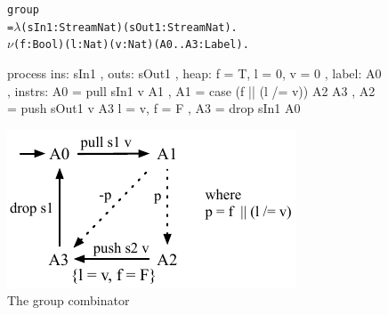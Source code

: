 \begin{figure}

\begin{center}
\begin{alltt}
           group 
             = \(\lambda\) (sIn1: Stream Nat) (sOut1: Stream Nat). 
               \(\nu\) (f: Bool) (l: Nat) (v: Nat) (A0..A3: Label).
\end{alltt}
\begin{code}
               process
               { ins:    { sIn1  }
               , outs:   { sOut1 }
               , heap:   { f = T, l = 0, v = 0 }
               , label:  A0
               , instrs: { A0 = pull sIn1 v          A1 {}
                         , A1 = case (f || (l /= v)) A2 {}  A3 {}
                         , A2 = push sOut1 v         A3 { l = v, f = F }
                         , A3 = drop sIn1            A0 {} } }
\end{code}
\end{center}
\vspace{1em}
\includegraphics[scale=1.1]{figures/state-group.pdf}
\caption{The group combinator}
\label{fig:Process:Group}
\end{figure}


